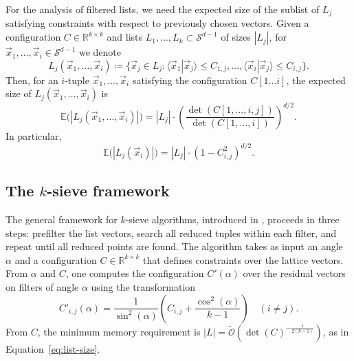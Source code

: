 \documentclass[10pt,a4paper]{article}
\begin{document}
For the analysis of filtered lists, we need the expected size of the sublist of \(L_j\) satisfying constraints with respect to previously chosen vectors. Given a configuration \(C\in\mathbb{R}^{k\times k}\) and lists \(L_1,\ldots,L_k\subset\mathcal{S}^{d-1}\) of sizes \(|L_j|\), for \(\vec{x}_1,\ldots,\vec{x}_i\in\mathcal{S}^{d-1}\) we denote
\begin{equation}
L_j(\vec{x}_1,\ldots,\vec{x}_i) \coloneqq \{\vec{x}_j\in L_j : \langle\vec{x}_1|\vec{x}_j\rangle\le C_{1,j},\ldots,\langle\vec{x}_i|\vec{x}_j\rangle\le C_{i,j}\}.
\end{equation}
Then, for an \(i\)-tuple \(\vec{x}_1,\ldots,\vec{x}_i\) satisfying the configuration \(C[1\ldots i]\), the expected size of \(L_j(\vec{x}_1,\ldots,\vec{x}_i)\) is
\begin{equation}
\mathbb{E}\bigl(|L_j(\vec{x}_1,\ldots,\vec{x}_i)|\bigr) = |L_j|\cdot\left(\frac{\det(C[1,\ldots,i,j])}{\det(C[1,\ldots,i])}\right)^{d/2}.
\end{equation}
In particular,
\begin{equation}
\mathbb{E}\bigl(|L_j(\vec{x}_i)|\bigr) = |L_j|\cdot(1-C_{i,j}^2)^{d/2}.
\label{eq:filtered-list-size}
\end{equation}

\subsection{The \(k\)-sieve framework}
\label{sec:k-sieve-framework}

The general framework for \(k\)-sieve algorithms, introduced in \cite{CL23}, proceeds in three steps: prefilter the list vectors, search all reduced tuples within each filter, and repeat until all reduced points are found. The algorithm takes as input an angle \(\alpha\) and a configuration \(C\in\mathbb{R}^{k\times k}\) that defines constraints over the lattice vectors. From \(\alpha\) and \(C\), one computes the configuration \(C'(\alpha)\) over the residual vectors on filters of angle \(\alpha\) using the transformation
\begin{equation}
C'_{i,j}(\alpha) = \frac{1}{\sin^2(\alpha)}\left(C_{i,j}+\frac{\cos^2(\alpha)}{k-1}\right) \quad (i\neq j).
\label{eq:config-transform}
\end{equation}
From \(C\), the minimum memory requirement is \(|L|=\tilde{\mathcal{O}}(\det(C)^{-\frac{1}{2(k-1)}})\), as in Equation~\eqref{eq:list-size}.
\end{document}
